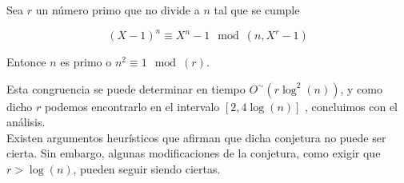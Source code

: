 \begin{conjetura}\label{conjetura_aks}
	Sea $r$ un número primo que no divide a $n$ tal que se cumple
	
	\begin{equation}
	(X - 1)^n \equiv X^n - 1 \mod(n, X^r - 1)
	\end{equation}
	
	Entonce $n$ es primo o $n^2 \equiv 1 \mod(r)$.
\end{conjetura}

Esta congruencia se puede determinar en tiempo $O^\sim(r\log^2(n))$, y como dicho $r$ podemos encontrarlo en el intervalo $[2, 4\log(n)]$ \cite{primes_is_in_p}, concluimos con el análisis.\\

Existen argumentos heurísticos \cite{50a} que afirman que dicha conjetura no puede ser cierta. Sin embargo, algunas modificaciones de la conjetura, como exigir que $r > \log(n)$, pueden seguir siendo ciertas.

\endinput
